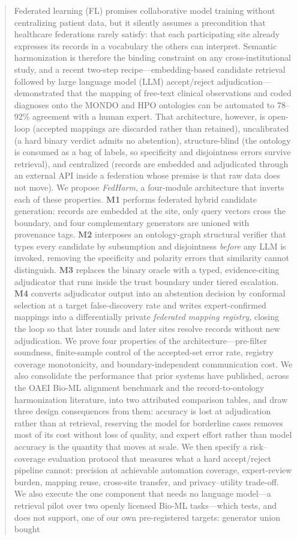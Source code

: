 \documentclass[conference]{IEEEtran}
\begin{document}
\begin{abstract}
Federated learning (FL) promises collaborative model training without centralizing patient data, but it silently assumes a precondition that healthcare federations rarely satisfy: that each participating site already expresses its records in a vocabulary the others can interpret. Semantic harmonization is therefore the binding constraint on any cross-institutional study, and a recent two-step recipe---embedding-based candidate retrieval followed by large language model (LLM) accept/reject adjudication---demonstrated that the mapping of free-text clinical observations and coded diagnoses onto the MONDO and HPO ontologies can be automated to 78--92\% agreement with a human expert. That architecture, however, is open-loop (accepted mappings are discarded rather than retained), uncalibrated (a hard binary verdict admits no abstention), structure-blind (the ontology is consumed as a bag of labels, so specificity and disjointness errors survive retrieval), and centralized (records are embedded and adjudicated through an external API inside a federation whose premise is that raw data does not move). We propose \emph{FedHarm}, a four-module architecture that inverts each of these properties. \textbf{M1} performs federated hybrid candidate generation: records are embedded at the site, only query vectors cross the boundary, and four complementary generators are unioned with provenance tags. \textbf{M2} interposes an ontology-graph structural verifier that types every candidate by subsumption and disjointness \emph{before} any LLM is invoked, removing the specificity and polarity errors that similarity cannot distinguish. \textbf{M3} replaces the binary oracle with a typed, evidence-citing adjudicator that runs inside the trust boundary under tiered escalation. \textbf{M4} converts adjudicator output into an abstention decision by conformal selection at a target false-discovery rate and writes expert-confirmed mappings into a differentially private \emph{federated mapping registry}, closing the loop so that later rounds and later sites resolve records without new adjudication. We prove four properties of the architecture---pre-filter soundness, finite-sample control of the accepted-set error rate, registry coverage monotonicity, and boundary-independent communication cost. We also consolidate the performance that prior systems have published, across the OAEI Bio-ML alignment benchmark and the record-to-ontology harmonization literature, into two attributed comparison tables, and draw three design consequences from them: accuracy is lost at adjudication rather than at retrieval, reserving the model for borderline cases removes most of its cost without loss of quality, and expert effort rather than model accuracy is the quantity that moves at scale. We then specify a risk--coverage evaluation protocol that measures what a hard accept/reject pipeline cannot: precision at achievable automation coverage, expert-review burden, mapping reuse, cross-site transfer, and privacy--utility trade-off. We also execute the one component that needs no language model---a retrieval pilot over two openly licensed Bio-ML tasks---which tests, and does not support, one of our own pre-registered targets: generator union bought 
\end{abstract}
\end{document}
